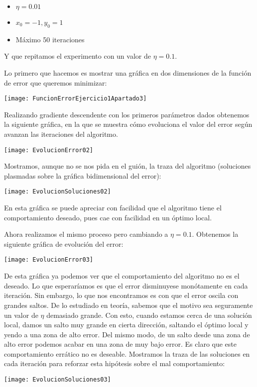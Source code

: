 \documentclass[11pt]{article}
\begin{document}
\begin{itemize}
    \item $\eta = 0.01$
    \item $x_0 = -1, y_0 = 1$
    \item Máximo 50 iteraciones
\end{itemize}

Y que repitamos el experimento con un valor de $\eta = 0.1$.

Lo primero que hacemos es mostrar una gráfica en dos dimensiones de la función de error que queremos minimizar:

\texttt{[image: FuncionErrorEjercicio1Apartado3]}

Realizando gradiente descendente con los primeros parámetros dados obtenemos la siguiente gráfica, en la que se muestra cómo evoluciona el valor del error según avanzan las iteraciones del algoritmo.

\texttt{[image: EvolucionError02]}

Mostramos, aunque no se nos pida en el guión, la traza del algoritmo (soluciones plasmadas sobre la gráfica bidimensional del error):

\texttt{[image: EvolucionSoluciones02]}

En esta gráfica se puede apreciar con facilidad que el algoritmo tiene el comportamiento deseado, pues cae con facilidad en un óptimo local.

Ahora realizamos el mismo proceso pero cambiando a $\eta = 0.1$. Obtenemos la siguiente gráfica de evolución del error:

\texttt{[image: EvolucionError03]}

De esta gráfica ya podemos ver que el comportamiento del algoritmo no es el deseado. Lo que esperaríamos es que el error disminuyese monótamente en cada iteración. Sin embargo, lo que nos encontramos es con que el error oscila con grandes saltos. De lo estudiado en teoría, sabemos que el motivo sea seguramente un valor de $\eta$ demasiado grande. Con esto, cuando estamos cerca de una solución local, damos un salto muy grande en cierta dirección, saltando el óptimo local y yendo a una zona de alto error. Del mismo modo, de un salto desde una zona de alto error podemos acabar en una zona de muy bajo error. Es claro que este comportamiento errático no es deseable. Mostramos la traza de las soluciones en cada iteración para reforzar esta hipótesis sobre el mal comportamiento:

\texttt{[image: EvolucionSoluciones03]}
\end{document}
